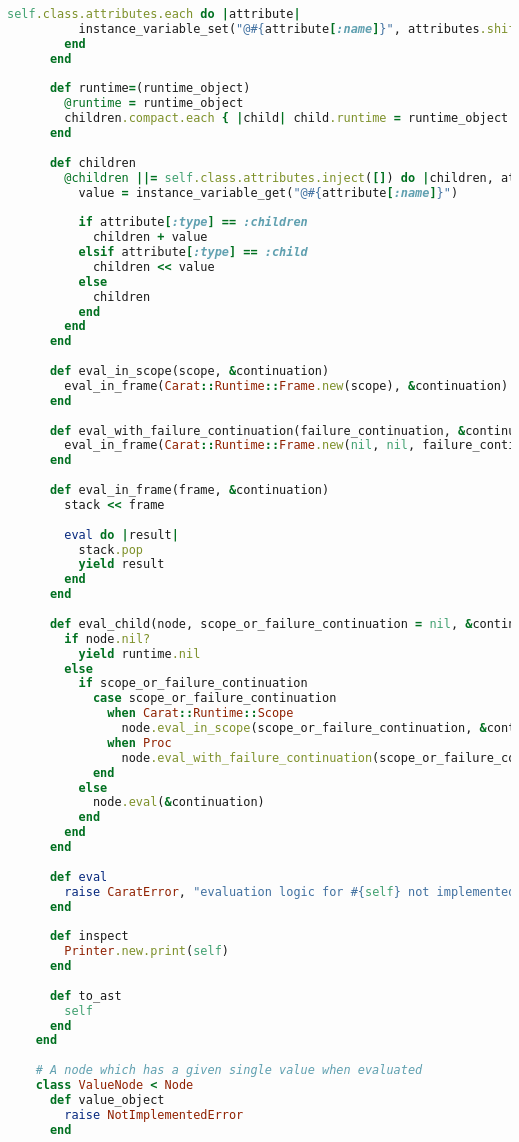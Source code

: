 \begin{lstlisting}[title={\small\Helvetica ast/ast.rb},language=Ruby]
        self.class.attributes.each do |attribute|
          instance_variable_set("@#{attribute[:name]}", attributes.shift || attribute[:default])
        end
      end
      
      def runtime=(runtime_object)
        @runtime = runtime_object
        children.compact.each { |child| child.runtime = runtime_object if child.is_a?(Node) }
      end
      
      def children
        @children ||= self.class.attributes.inject([]) do |children, attribute|
          value = instance_variable_get("@#{attribute[:name]}")
          
          if attribute[:type] == :children
            children + value
          elsif attribute[:type] == :child
            children << value
          else
            children
          end
        end
      end
      
      def eval_in_scope(scope, &continuation)
        eval_in_frame(Carat::Runtime::Frame.new(scope), &continuation)
      end
      
      def eval_with_failure_continuation(failure_continuation, &continuation)
        eval_in_frame(Carat::Runtime::Frame.new(nil, nil, failure_continuation), &continuation)
      end
      
      def eval_in_frame(frame, &continuation)
        stack << frame
        
        eval do |result|
          stack.pop
          yield result
        end
      end
      
      def eval_child(node, scope_or_failure_continuation = nil, &continuation)
        if node.nil?
          yield runtime.nil
        else
          if scope_or_failure_continuation
            case scope_or_failure_continuation
              when Carat::Runtime::Scope
                node.eval_in_scope(scope_or_failure_continuation, &continuation)
              when Proc
                node.eval_with_failure_continuation(scope_or_failure_continuation, &continuation)
            end
          else
            node.eval(&continuation)
          end
        end
      end
      
      def eval
        raise CaratError, "evaluation logic for #{self} not implemented"
      end
      
      def inspect
        Printer.new.print(self)
      end
      
      def to_ast
        self
      end
    end
    
    # A node which has a given single value when evaluated
    class ValueNode < Node
      def value_object
        raise NotImplementedError
      end
      

\end{lstlisting}
